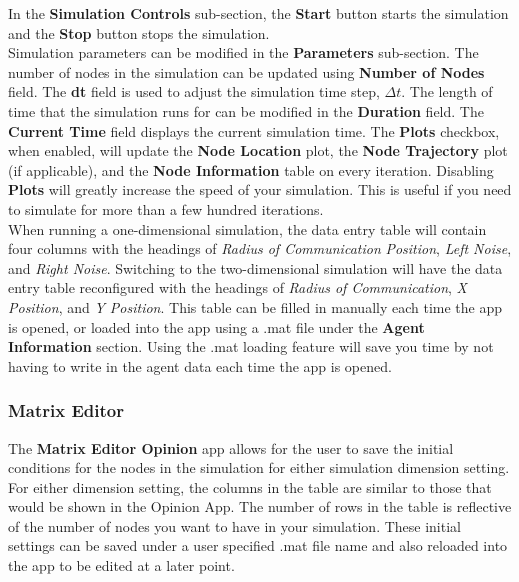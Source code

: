 \documentclass[../CourseManual.tex]{subfiles}
\begin{document}
In the \textbf{Simulation Controls} sub-section, the \textbf{Start} button starts the simulation and the \textbf{Stop} button stops the simulation. \\

Simulation parameters can be modified in the \textbf{Parameters} sub-section. The number of nodes in the simulation can be updated using \textbf{Number of Nodes} field. The \textbf{dt} field is used to adjust the simulation time step, $\Delta t$. The length of time that the simulation runs for can be modified in the \textbf{Duration} field. The \textbf{Current Time} field displays the current simulation time. The \textbf{Plots} checkbox, when enabled, will update the \textbf{Node Location} plot, the \textbf{Node Trajectory} plot (if applicable), and the \textbf{Node Information} table on every iteration. Disabling \textbf{Plots} will greatly increase the speed of your simulation. This is useful if you need to simulate for more than a few hundred iterations. \\

When running a one-dimensional simulation, the data entry table will contain four columns with the headings of \textit{Radius of Communication} \textit{Position}, \textit{Left Noise}, and \textit{Right Noise}. Switching to the two-dimensional simulation will have the data entry table reconfigured with the headings of \textit{Radius of Communication}, \textit{X Position}, and \textit{Y Position}. This table can be filled in manually each time the app is opened, or loaded into the app using a .mat file under the \textbf{Agent Information} section. Using the .mat loading feature will save you time by not having to write in the agent data each time the app is opened.

\subsubsection{Matrix Editor} \label{Matrix Editor: Opinion}

The \textbf{Matrix Editor Opinion} app allows for the user to save the initial conditions for the nodes in the simulation for either simulation dimension setting. For either dimension setting, the columns in the table are similar to those that would be shown in the Opinion App. The number of rows in the table is reflective of the number of nodes you want to have in your simulation. These initial settings can be saved under a user specified .mat file name and also reloaded into the app to be edited at a later point. 
\end{document}
